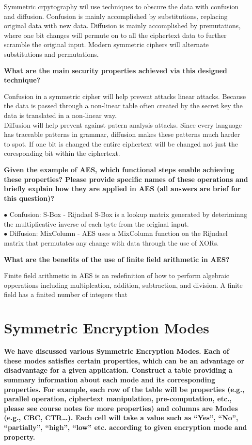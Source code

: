 \documentclass[letterpaper,11pt,notitlepage,fleqn]{article}
\begin{document}
Symmetric crpytography wil use techniques to obscure the data with confusion and diffusion. Confusion is mainly accomplished by substitutions, replacing original data with new data. Diffusion is mainly accomplished by premutations, where one bit changes will permute on to all the ciphertext data to further scramble the original input. Modern symmetric ciphers will alternate substitutions and permutations.

\noindent \textbf{What are the main security properties achieved via this designed technique?}

Confusion in a symmetric cipher will help prevent attacks linear attacks. Because the data is passed through a non-linear table often created by the secret key the data is translated in a non-linear way.\\
\indent Diffusion will help prevent against patern analysis attacks. Since every language has traceable patterns in grammar, diffusion makes these patterns much harder to spot. If one bit is changed the entire ciphertext will be changed not just the coresponding bit within the ciphertext. 

\noindent \textbf{Given the  example  of  AES,  which  functional  steps  enable achieving  these  properties?  Please provide  specific  names  of  these operations  and  briefly  explain  how  they  are  applied  in AES (all answers are brief for this question)?}

\noindent$\bullet$ Confusion: S-Box - Rijndael S-Box is a lookup matrix generated by deteriminng the multiplicative inverse of each byte from the original input. \\
$\bullet$ Diffusion: MixColumn - AES uses a MixColumn function on the Rijndael matrix that permutates any change with data through the use of XORs. 

\noindent \textbf{What are the benefits of the use of finite field arithmetic in AES?}

Finite field arithmetic in AES is an redefinition of how to perform algebraic opperations including multiplcation, addition, subtraction, and division. A finite field has a finited number of integers that  

\section{Symmetric Encryption Modes}
\noindent \textbf{We have discussed various Symmetric Encryption Modes. Each of  these modes  satisfies certain properties, which can be  an  advantage or disadvantage  for  a given  application. Construct a  table providing a  summary  information  about  each mode and  its corresponding properties. For example,  each  row  of  the  table  will  be  properties  (e.g.,  parallel  operation,  ciphertext manipulation,  pre-computation,  etc.,  please  see  course  notes  for  more  properties)  and  columns are  Modes  (e.g.,  CBC,  CTR…).  Each  cell  will  take  a  value  such  as  “Yes”,  “No”,  “partially”, “high”, “low” etc. according to given encryption mode and property.}
\end{document}
